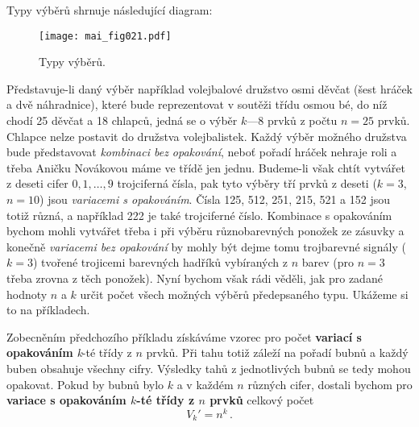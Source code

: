       Typy výběrů shrnuje následující diagram:
      \begin{figure}[ht!] %
        \centering
        \texttt{[image: mai\_fig021.pdf]}
        \caption{Typy výběrů. \cite[s.~201]{Musilova2009MA1}}
        \label{mai_fig021}
      \end{figure}

      Představuje-li daný výběr například volejbalové družstvo osmi děvčat (šest hráček a dvě 
      náhradnice), které bude reprezentovat v soutěži třídu osmou bé, do níž chodí \num{25} děvčat 
      a \num{18} chlapců, jedná se o výběr \(k — 8\) prvků z počtu \(n = 25\) prvků. Chlapce nelze 
      postavit do družstva volejbalistek. Každý výběr možného družstva bude představovat 
      \emph{kombinaci bez opakování}, neboť pořadí hráček nehraje roli a třeba Aničku Novákovou 
      máme ve třídě jen jednu. Budeme-li však chtít vytvářet z deseti cifer \(0, 1, \ldots, 9\) 
      trojciferná čísla, pak tyto výběry tří prvků z deseti (\(k = 3\), \(n = 10\)) jsou 
      \emph{variacemi s opakováním}. Čísla \num{125}, \num{512}, \num{251}, \num{215}, \num{521} a 
      \num{152} jsou totiž různá, a například \num{222} je také trojciferné číslo. Kombinace s 
      opakováním bychom mohli vytvářet třeba i při výběru různobarevných ponožek ze zásuvky a 
      konečně \emph{variacemi bez opakování} by mohly být dejme tomu trojbarevné signály (\(k = 
      3\)) tvořené trojicemi barevných hadříků vybíraných z \(n\) barev (pro \(n = 3\) třeba zrovna 
      z těch ponožek). Nyní bychom však rádi věděli, jak pro zadané hodnoty \(n\) a \(k\) určit 
      počet všech možných výběrů předepsaného typu. Ukážeme si to na příkladech.

      
      
      Zobecněním předchozího příkladu získáváme vzorec pro počet \textbf{variací s opakováním} 
      \emph{k}-té třídy z \(n\) prvků. Při tahu totiž záleží na pořadí bubnů a každý buben obsahuje 
      všechny cifry. Výsledky tahů z jednotlivých bubnů se tedy mohou opakovat. Pokud by bubnů bylo 
      \(k\) a v každém \(n\) různých cifer, dostali bychom pro \textbf{variace s opakováním 
      \(k\)-té třídy z \(n\) prvků} celkový počet
      \begin{equation}\label{mai:eq007}
        \boxed{V_k' = n^k}\, .
      \end{equation}

